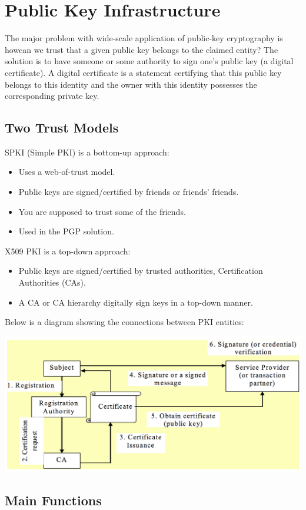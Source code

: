 \documentclass{article}
\begin{document}
\section{Public Key Infrastructure}
The major problem with wide-scale application of public-key cryptography is howcan we trust that a given public key belongs to the claimed entity? The solution is to have someone or some authority to sign one's public key (a digital certificate). A digital certificate is a statement certifying that this public key belongs to this identity and the owner with this identity possesses the corresponding private key.

\subsection{Two Trust Models}
SPKI (Simple PKI) is a bottom-up approach:
\begin{itemize}
  \item Uses a web-of-trust model.
  \item Public keys are signed/certified by friends or friends' friends.
  \item You are supposed to trust some of the friends.
  \item Used in the PGP solution.
\end{itemize}
X509 PKI is a top-down approach:
\begin{itemize}
  \item Public keys are signed/certified by trusted authorities, Certification Authorities (CAs).
  \item A CA or CA hierarchy digitally sign keys in a top-down manner.
\end{itemize}
Below is a diagram showing the connections between PKI entities:
\begin{center}
  \includegraphics[scale=0.5]{pki.png}
\end{center}

\subsection{Main Functions}
\end{document}
